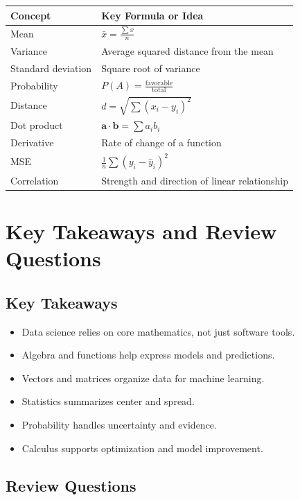 \documentclass[11pt,a4paper]{article}
\begin{document}
\begin{longtable}{p{3.4cm}p{7.8cm}}
\toprule
\textbf{Concept} & \textbf{Key Formula or Idea} \\
\midrule
Mean & $\bar{x} = \frac{\sum x}{n}$ \\
Variance & Average squared distance from the mean \\
Standard deviation & Square root of variance \\
Probability & $P(A) = \frac{\text{favorable}}{\text{total}}$ \\
Distance & $d = \sqrt{\sum (x_i-y_i)^2}$ \\
Dot product & $\mathbf{a} \cdot \mathbf{b} = \sum a_ib_i$ \\
Derivative & Rate of change of a function \\
MSE & $\frac{1}{n}\sum (y_i - \hat{y}_i)^2$ \\
Correlation & Strength and direction of linear relationship \\
\bottomrule
\end{longtable}

\section{Key Takeaways and Review Questions}

\subsection{Key Takeaways}

\begin{itemize}[leftmargin=*]
  \item Data science relies on core mathematics, not just software tools.
  \item Algebra and functions help express models and predictions.
  \item Vectors and matrices organize data for machine learning.
  \item Statistics summarizes center and spread.
  \item Probability handles uncertainty and evidence.
  \item Calculus supports optimization and model improvement.
\end{itemize}

\subsection{Review Questions}
\end{document}
